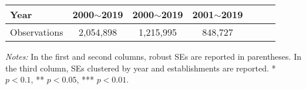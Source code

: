 \documentclass{beamer}
\begin{document}
{\begin{table}[t]
\begin{center}
\begin{tabular}{lcccccc
        }
        Year                  & 2000$\sim$2019                                  & 2000$\sim$2019                & 2001$\sim$2019 \\\hline
        Observations          & 2,054,898                                       & 1,215,995                     & 848,727        \\
        \hline
      \end{tabular}
    \end{center}
    \vspace{0.05in}
    \footnotesize{\tiny\textit{Notes:} In the first and second columns, robust SEs are reported in parentheses. In the third column, SEs clustered by year and establishments are reported. * $p<0.1$, ** $p<0.05$, *** $p<0.01$. }
  \end{table}
}
\end{document}
